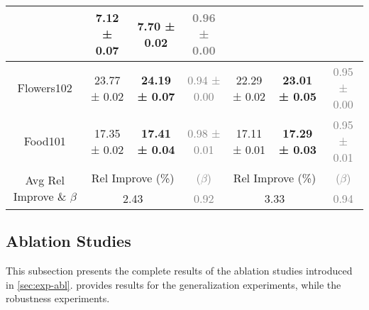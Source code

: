\begin{table*}[h]
\begin{center}
\begin{small}
{\begin{tabular}{|c|c|c|c|c|c|c|}
                  & 7.12 ± 0.07 & \textbf{7.70 ± 0.02} & \textcolor{gray}{0.96 ± 0.00} \\ \hline
Flowers102        & 23.77 ± 0.02 & \textbf{24.19 ± 0.07} & \textcolor{gray}{0.94 ± 0.00}
                  & 22.29 ± 0.02 & \textbf{23.01 ± 0.05} & \textcolor{gray}{0.95 ± 0.00} \\ \hline
Food101           & 17.35 ± 0.02 & \textbf{17.41 ± 0.04} & \textcolor{gray}{0.98 ± 0.01} 
                  & 17.11 ± 0.01 & \textbf{17.29 ± 0.03} & \textcolor{gray}{0.95 ± 0.01}  \\ \hline
\multirow{2}{*}{Avg Rel Improve \& $\beta$} & \multicolumn{2}{c|}{Rel Improve (\%)} & \textcolor{gray}{($\beta$)} & \multicolumn{2}{c|}{Rel Improve (\%)} & \textcolor{gray}{($\beta$)} \\ \cline{2-7} 
                  & \multicolumn{2}{c|}{2.43} 
                  & \textcolor{gray}{0.92}
                  & \multicolumn{2}{c|}{3.33} 
                  & \textcolor{gray}{0.94} \\ \hline
\end{tabular}
}
\end{small}
\end{center}
\vskip -0.1in
\end{table*}



\subsection{Ablation Studies}\label{app:exp-abl}  
This subsection presents the complete results of the ablation studies introduced in \cref{sec:exp-abl}.  provides results for the generalization experiments, while  the robustness experiments.  

